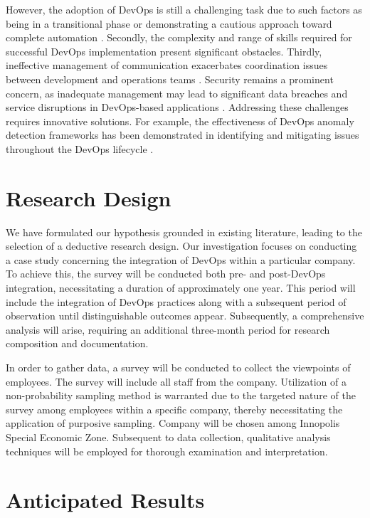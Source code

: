 \documentclass[oneside,final,12pt,a4paper]{extreport}
\begin{document}
However, the adoption of DevOps is still a challenging task due to such factors as being in a transitional phase or demonstrating a cautious approach toward complete automation \cite{12}. Secondly, the complexity and range of skills required for successful DevOps implementation present significant obstacles. Thirdly, ineffective management of communication exacerbates coordination issues between development and operations teams \cite{7}. Security remains a prominent concern, as inadequate management may lead to significant data breaches and service disruptions in DevOps-based applications \cite{14}. Addressing these challenges requires innovative solutions. For example, the effectiveness of DevOps anomaly detection frameworks has been demonstrated in identifying and mitigating issues throughout the DevOps lifecycle \cite{13}.

\section{Research Design}

We have formulated our hypothesis grounded in existing literature, leading to the selection of a deductive research design. Our investigation focuses on conducting a case study concerning the integration of DevOps within a particular company. To achieve this, the survey will be conducted both pre- and post-DevOps integration, necessitating a duration of approximately one year. This period will include the integration of DevOps practices along with a subsequent period of observation until distinguishable outcomes appear. Subsequently, a comprehensive analysis will arise, requiring an additional three-month period for research composition and documentation.

In order to gather data, a survey will be conducted to collect the viewpoints of employees. The survey will include all staff from the company. Utilization of a non-probability sampling method is warranted due to the targeted nature of the survey among employees within a specific company, thereby necessitating the application of purposive sampling. Company will be chosen among Innopolis Special Economic Zone. Subsequent to data collection, qualitative analysis techniques will be employed for thorough examination and interpretation.

\section{Anticipated Results}
\end{document}
